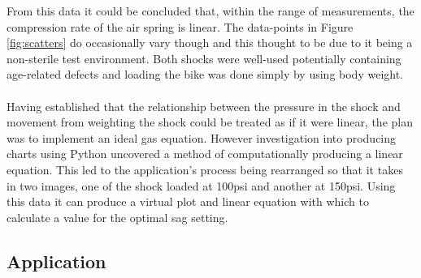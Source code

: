 			From this data it could be concluded that, within the range of measurements, the compression rate of the air spring is linear. The data-points in Figure \ref{fig:scatters} do occasionally vary though and this thought to be due to it being a non-sterile test environment. Both shocks were well-used potentially containing age-related defects and loading the bike was done simply by using body weight.
			\\\\
			Having established that the relationship between the pressure in the shock and movement from weighting the shock could be treated as if it were linear, the plan was to implement an ideal gas equation. However investigation into producing charts using Python uncovered a method of computationally producing a linear equation. This led to the application’s process being rearranged so that it takes in two images, one of the shock loaded at 100psi and another at 150psi. Using this data it can produce a virtual plot and linear equation with which to calculate a value for the optimal sag setting.
	\subsection{Application}
